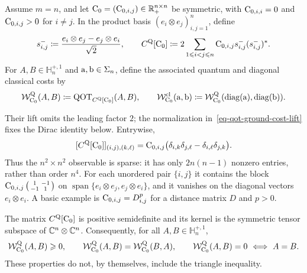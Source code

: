\begin{defn}\label{def-qot-ground-cost-lift}
	Assume $m=n$, and let $\mathrm{C}_0=(\mathrm{C}_{0,i,j})\in\mathbb{R}_+^{n\times n}$ be symmetric, with $\mathrm{C}_{0,i,i}=0$ and $\mathrm{C}_{0,i,j}>0$ for $i\neq j$. In the product basis $(e_i\otimes e_j)_{i,j=1}^n$, define
	\begin{equation}\label{eq-qot-ground-cost-lift}
		s_{i,j}^-\coloneqq\frac{e_i\otimes e_j-e_j\otimes e_i}{\sqrt2},
		\qquad
		C^{\mathrm Q}[\mathrm{C}_0]
		\coloneqq
		2\sum_{1\leqslant i<j\leqslant n}\mathrm{C}_{0,i,j}s_{i,j}^-(s_{i,j}^-)^*.
	\end{equation}
	For $A,B\in\mathbb H_n^{+,1}$ and $\mathrm{a},\mathrm{b}\in\Sigma_n$, define the associated quantum and diagonal classical costs by
	\begin{equation}\label{eq-qot-ground-cost-values}
		\mathcal W_{\mathrm{C}_0}^{\mathrm Q}(A,B)
		\coloneqq\mathrm{QOT}_{C^{\mathrm Q}[\mathrm{C}_0]}(A,B),
		\qquad
		\mathcal W_{\mathrm{C}_0}^{\mathrm{cl}}(\mathrm{a},\mathrm{b})
		\coloneqq\mathcal W_{\mathrm{C}_0}^{\mathrm Q}(\operatorname{diag}(\mathrm{a}),\operatorname{diag}(\mathrm{b})).
	\end{equation}
\end{defn}

Their lift omits the leading factor $2$; the normalization in~\eqref{eq-qot-ground-cost-lift} fixes the Dirac identity below. Entrywise,
\begin{equation}\label{eq-qot-ground-cost-lift-entries}
	[C^{\mathrm Q}[\mathrm{C}_0]]_{(i,j),(k,\ell)}
	=
	\mathrm{C}_{0,i,j}\bigl(\delta_{i,k}\delta_{j,\ell}-\delta_{i,\ell}\delta_{j,k}\bigr).
\end{equation}
Thus the $n^2\times n^2$ observable is sparse: it has only $2n(n-1)$ nonzero entries, rather than order $n^4$. For each unordered pair $\{i,j\}$ it contains the block $\mathrm{C}_{0,i,j}\left(\begin{smallmatrix}1&-1\\-1&1\end{smallmatrix}\right)$ on $\operatorname{span}\{e_i\otimes e_j,e_j\otimes e_i\}$, and it vanishes on the diagonal vectors $e_i\otimes e_i$. A basic example is $\mathrm{C}_{0,i,j}=D_{i,j}^p$ for a distance matrix $D$ and $p>0$.

\begin{prop}\label{prop-qot-ground-cost-semidistance}
	The matrix $C^{\mathrm Q}[\mathrm{C}_0]$ is positive semidefinite and its kernel is the symmetric tensor subspace of $\mathbb{C}^n\otimes\mathbb{C}^n$. Consequently,
	for all $A,B\in\mathbb H_n^{+,1}$,
	\[
		\mathcal W_{\C_0}^{\mathrm Q}(A,B)\geq0,
		\qquad
		\mathcal W_{\C_0}^{\mathrm Q}(A,B)=\mathcal W_{\C_0}^{\mathrm Q}(B,A),
		\qquad
		\mathcal W_{\C_0}^{\mathrm Q}(A,B)=0\ \Longleftrightarrow\ A=B.
	\]
	These properties do not, by themselves, include the triangle inequality.
\end{prop}

